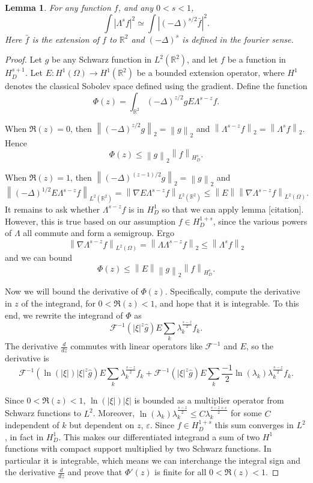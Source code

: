 \documentclass[11pt]{amsart}
\newtheorem{lemma}[theorem]{Lemma}
\theoremstyle{remark}
\theoremstyle{definition}
\newcommand{\R}{\mathbb{R}}
\newcommand{\Four}{\mathcal{F}}
\newcommand{\eps}{\varepsilon}
\newcommand{\norm}[1]{\left\lVert#1\right\rVert}
\newcommand{\paren}[1]{\left( #1 \right)}
\newcommand{\abs}[1]{\left\lvert #1 \right\rvert}
\newcommand{\grad}{\nabla}
\newcommand{\Laplace}{\Delta}
\newcommand{\ddz}{\frac{d}{dz}}
\newcommand{\n}{^{-1}}
\begin{document}
\begin{lemma}
For any function $f$, and any $0 < s < 1$,
\[ \int \abs{\Lambda^s f}^2 \simeq \int \abs{\paren{-\Laplace}^{s/2} \bar{f}}^2. \]
Here $\bar{f}$ is the extension of $f$ to $\R^2$ and $\paren{-\Laplace}^s$ is defined in the fourier sense.  
\end{lemma}

\begin{proof}
Let $g$ be any Schwarz function in $L^2(\R^2)$, and let $f$ be a function in $H^{s+1}_D$.  Let $E:H^1(\Omega) \to H^1(\R^2)$ be a bounded extension operator, where $H^1$ denotes the classical Sobolev space defined using the gradient.  Define the function
\[ \Phi(z) = \int_{\R^2} \paren{-\Laplace}^{z/2} g E \Lambda^{s-z} f. \]

When $\Re(z) = 0$, then $\norm{\paren{-\Laplace}^{z/2} g}_2 = \norm{g}_2$ and $\norm{\Lambda^{s-z} f}_2 = \norm{\Lambda^s f}_2$.  Hence
\[ \Phi(z) \leq \norm{g}_2 \norm{f}_{H^s_D}. \]

When $\Re(z)=1$, then $\norm{\paren{-\Laplace}^{(z-1)/2} g}_2 = \norm{g}_2$ and 
\[ \norm{\paren{-\Laplace}^{1/2} E\Lambda^{s-z} f}_{L^2(\R^2)} = \norm{\grad E \Lambda^{s-z} f}_{L^2(\R^2)} \leq \norm{E} \norm{\grad \Lambda^{s-z} f}_{L^2(\Omega)}. \]
It remains to ask whether $\Lambda^{s-z} f$ is in $H^1_D$ so that we can apply lemma [citation].  However, this is true based on our assumption $f \in H^{1+s}_D$, since the various powers of $\Lambda$ all commute and form a semigroup.  Ergo
\[ \norm{\grad \Lambda^{s-z} f}_{L^2(\Omega)} = \norm{\Lambda \Lambda^{s-z} f}_2 \leq \norm{\Lambda^s f}_2 \]
and we can bound
\[ \Phi(z) \leq \norm{E} \norm{g}_2 \norm{f}_{H^s_D}. \]

Now we will bound the derivative of $\Phi(z)$.  Specifically, compute the derivative in $z$ of the integrand, for $0<\Re(z)<1$, and hope that it is integrable.  To this end, we rewrite the integrand of $\Phi$ as
\[ \Four\n\paren{ |\xi|^z \hat{g} } E \sum_k \lambda_k^{\frac{s-z}{2}} f_k. \]
The derivative $\ddz$ commutes with linear operators like $\Four\n$ and $E$, so the derivative is
\[ \Four\n\paren{ \ln(|\xi|) |\xi|^z \hat{g} } E \sum_k \lambda_k^{\frac{s-z}{2}} f_k + \Four\n\paren{ |\xi|^z \hat{g} } E \sum_k \frac{-1}{2} \ln(\lambda_k) \lambda_k^{\frac{s-z}{2}} f_k. \]

Since $0<\Re(z)<1$, $\ln(|\xi|)|\xi|$ is bounded as a multiplier operator from Schwarz functions to $L^2$.  Moreover, $\ln(\lambda_k) \lambda_k^{\frac{s-z}{2}} \leq C \lambda_k^{\frac{s-z+\eps}{2}}$ for some $C$ independent of $k$ but dependent on $z$, $\eps$.  Since $f \in H^{1+s}_D$ this sum converges in $L^2$, in fact in $H_D^1$.  This makes our differentiated integrand a sum of two $H^1$ functions with compact support multiplied by two Schwarz functions.  In particular it is integrable, which means we can interchange the integral sign and the derivative $\ddz$ and prove that $\Phi'(z)$ is finite for all $0<\Re(z)<1$. 


\end{proof}
\end{document}
